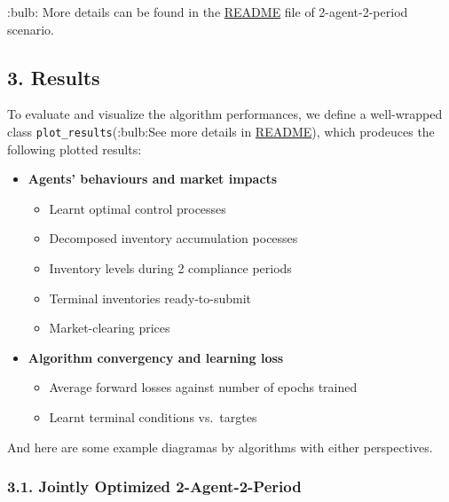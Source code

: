 \documentclass[
]{article}
\providecommand{\tightlist}{%
  \setlength{\itemsep}{0pt}\setlength{\parskip}{0pt}}
\begin{document}
:bulb: More details can be found in the
\href{../2Period/Joint_Optim_2Prdx1/README.md}{README} file of
2-agent-2-period scenario.

\hypertarget{results}{%
\subsection{3. Results}\label{results}}

To evaluate and visualize the algorithm performances, we define a
well-wrapped class \texttt{plot\_results}(:bulb:See more details in
\href{../2Period/Joint_Optim_2Prdx1/README.md}{README}), which prodeuces
the following plotted results:

\begin{itemize}
\tightlist
\item
  \textbf{Agents' behaviours and market impacts}

  \begin{itemize}
  \tightlist
  \item
    Learnt optimal control processes
  \item
    Decomposed inventory accumulation pocesses
  \item
    Inventory levels during 2 compliance periods
  \item
    Terminal inventories ready-to-submit
  \item
    Market-clearing prices
  \end{itemize}
\item
  \textbf{Algorithm convergency and learning loss}

  \begin{itemize}
  \tightlist
  \item
    Average forward losses against number of epochs trained
  \item
    Learnt terminal conditions vs.~targtes
  \end{itemize}
\end{itemize}

And here are some example diagramas by algorithms with either
perspectives.

\hypertarget{jointly-optimized-2-agent-2-period}{%
\subsubsection{3.1. Jointly Optimized
2-Agent-2-Period}\label{jointly-optimized-2-agent-2-period}}
\end{document}
